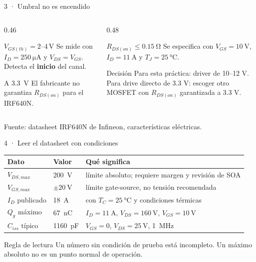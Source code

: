\documentclass[aspectratio=169]{beamer}
\begin{document}
\begin{frame}{3 · Umbral no es encendido}
  \begin{columns}[T]
    \begin{column}{0.46\textwidth}
      \begin{block}{$V_{GS(th)}=2$--$4\,\mathrm{V}$}
        Se mide con $I_D=\SI{250}{\micro\ampere}$ y $V_{DS}=V_{GS}$.
        Detecta el \textbf{inicio} del canal.
      \end{block}
      \begin{alertblock}{A \SI{3.3}{\volt}}
        El fabricante no garantiza $R_{DS(on)}$ para el IRF640N.
      \end{alertblock}
    \end{column}
    \begin{column}{0.48\textwidth}
      \begin{block}{$R_{DS(on)}\le\SI{0.15}{\ohm}$}
        Se especifica con $V_{GS}=\SI{10}{\volt}$, $I_D=\SI{11}{\ampere}$ y
        $T_J=\SI{25}{\celsius}$.
      \end{block}
      \begin{exampleblock}{Decisión}
        Para esta práctica: driver de 10--12 V. Para drive directo de 3.3 V:
        escoger otro MOSFET con $R_{DS(on)}$ garantizada a 3.3 V.
      \end{exampleblock}
    \end{column}
  \end{columns}
  \vfill
  {\tiny Fuente: datasheet IRF640N de Infineon, características eléctricas.}
\end{frame}

\begin{frame}{4 · Leer el datasheet con condiciones}
  \small
  \begin{tabular}{p{}p{}p{}}
    \toprule
    Dato & Valor & Qué significa \\
    \midrule
    $V_{DS,max}$ & \SI{200}{\volt} & límite absoluto; requiere margen y revisión de SOA \\
    $V_{GS,max}$ & $\pm\SI{20}{\volt}$ & límite gate-source, no tensión recomendada \\
    $I_D$ publicado & \SI{18}{\ampere} & con $T_C=\SI{25}{\celsius}$ y condiciones térmicas \\
    $Q_g$ máximo & \SI{67}{\nano\coulomb} & $I_D=\SI{11}{\ampere}$, $V_{DS}=\SI{160}{\volt}$, $V_{GS}=\SI{10}{\volt}$ \\
    $C_{iss}$ típico & \SI{1160}{\pico\farad} & $V_{GS}=0$, $V_{DS}=\SI{25}{\volt}$, \SI{1}{\mega\hertz} \\
    \bottomrule
  \end{tabular}
  \begin{block}{Regla de lectura}
    Un número sin condición de prueba está incompleto. Un máximo absoluto no
    es un punto normal de operación.
  \end{block}
\end{frame}
\end{document}
